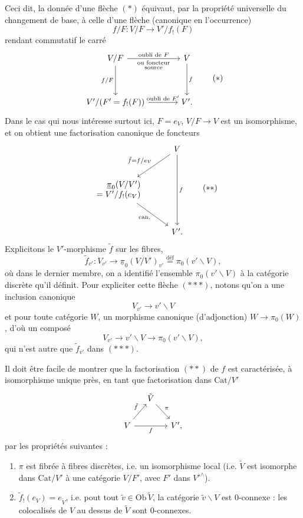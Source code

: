 \documentclass[11pt]{article}
\newcommand{\printedpage}[1]{\marginpar{\footnotesize p.~#1}}
\newcommand{\msp}[1]{\marginpar{\footnotesize [#1]}}
\newcommand{\defeq}{\overset{\text{déf}}{=}}
\newcommand{\upi}{\underline{\pi}}
\newcommand{\Cat}{\mathrm{Cat}}
\newcommand{\Ob}{\mathrm{Ob}\,}
\begin{document}
Ceci dit, la donnée d'une flèche $(*)$ équivaut, par la propriété universelle du changement de base, à celle d'une flèche (canonique en l'occurrence)
\[ f/F : V/F \longrightarrow V'/f_!(F) \]
rendant commutatif le carré
\[
\begin{tikzcd}[column sep=large, row sep=huge]
V/F \arrow[r, "\text{oubli de }F", "\substack{\text{ou foncteur}\\ \text{source}}"'] \arrow[d, "f/F"'] & V \arrow[d, "f"] \\
V'/(F' = f_!(F)) \arrow[r, "\text{oubli de }F'"] & V'.
\end{tikzcd}
\tag*{$(*)$}
\]
Dans le cas qui nous intéresse surtout ici, $F = e_V$, $V/F \longrightarrow V$ est un isomorphisme, et on obtient une factorisation canonique de foncteurs \msp{page 91}
\[
\begin{tikzcd}[row sep=large]
 & V \arrow[dl, "\tilde{f}=f/e_V"'] \arrow[dd, "f"] \\
\begin{array}{r} \upi_0(V/V') \\ = V'/f_!(e_V) \end{array} \arrow[dr, "\text{can.}"'] & \\
 & V'.
\end{tikzcd}
\tag*{$(**)$}
\]
Explicitons le $V'$-morphisme $\tilde{f}$ sur les fibres,
\[ \tilde{f}_{v'} : V_{v'} \longrightarrow \upi_0(V/V')_{v'} \defeq \pi_0(v'\backslash V), \tag*{$(***)$} \]
où dans le dernier membre, on a identifié l'ensemble $\pi_0(v'\backslash V)$ à la catégorie discrète qu'il définit. Pour expliciter cette flèche $(***)$, notons qu'on a une inclusion canonique
\[ V_{v'} \longrightarrow v'\backslash V \]
et pour toute catégorie $W$, un morphisme canonique (d'adjonction) $W \longrightarrow \pi_0(W)$, d'où un composé
\[ V_{v'} \longrightarrow v'\backslash V \longrightarrow \pi_0(v'\backslash V), \]
qui n'est autre que $\tilde{f}_{v'}$ dans $(***)$.

Il doit être facile de montrer que la factorisation $(**)$ de $f$ est caractérisée, à isomorphisme unique près, en tant que
\printedpage{65}
\msp{page 92}
factorisation dans $\Cat/V'$
\[
\begin{tikzcd}[column sep=small]
 & \tilde{V} \arrow[dr, "\pi"] & \\
V \arrow[ur, "\tilde{f}"] \arrow[rr, "f"'] & & V',
\end{tikzcd}
\]
par les propriétés suivantes :
\begin{enumerate}[label={}, leftmargin=*]
\item[a)] $\pi$ est fibrée à fibres discrètes, i.e. un isomorphisme local (i.e. $\tilde{V}$ est isomorphe dans $\Cat/V'$ à une catégorie $V/F'$, avec $F'$ dans $V'^{\wedge}$). %
\item[b)] $\tilde{f}_!(e_V) = e_{\tilde{V}}$, i.e. pout tout $\tilde{v} \in \Ob \tilde{V}$, la catégorie $\tilde{v}\backslash V$ est 0-connexe : les colocalisés de $V$ au dessus de $\tilde{V}$ sont 0-connexes. %
\end{enumerate}
\end{document}
